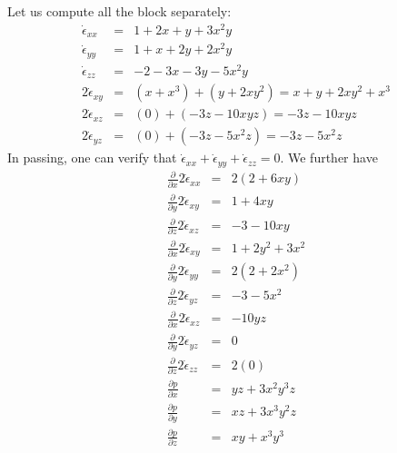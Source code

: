 Let us compute all the block separately:
\begin{eqnarray}
\dot{\epsilon}_{xx}&=& 1+2x+y+3x^2y  \nonumber\\
\dot{\epsilon}_{yy}&=& 1+x+2y+2x^2y \nonumber\\
\dot{\epsilon}_{zz}&=& -2-3x-3y-5x^2y \nonumber\\
2 \dot{\epsilon}_{xy}&=& (x+x^3)+(y+2xy^2) = x+y+2xy^2+x^3 \nonumber\\
2 \dot{\epsilon}_{xz}&=& (0)+(-3z-10xyz) = -3z -10xyz  \nonumber\\
2 \dot{\epsilon}_{yz}&=& (0) + (-3z-5x^2z) = -3z-5x^2z   \nonumber
\end{eqnarray}
In passing, one can verify that 
$
\dot{\epsilon}_{xx}
+\dot{\epsilon}_{yy}
+\dot{\epsilon}_{zz}=0
$.
We further have
\begin{eqnarray}
\frac{\partial}{\partial x} 2\dot{\epsilon}_{xx}&=& 2(2 +6xy) \nonumber\\ 
\frac{\partial}{\partial y} 2\dot{\epsilon}_{xy}&=&  1+4xy \nonumber\\
\frac{\partial}{\partial z} 2\dot{\epsilon}_{xz}&=& -3 -10xy   \nonumber\\ 
\frac{\partial}{\partial x} 2\dot{\epsilon}_{xy}&=& 1+2y^2+3x^2 \nonumber\\ 
\frac{\partial}{\partial y} 2\dot{\epsilon}_{yy}&=& 2( 2+2x^2 ) \nonumber\\ 
\frac{\partial}{\partial z} 2\dot{\epsilon}_{yz}&=& -3-5x^2   \nonumber\\
\frac{\partial}{\partial x} 2\dot{\epsilon}_{xz}&=& -10yz \nonumber\\ 
\frac{\partial}{\partial y} 2\dot{\epsilon}_{yz}&=& 0  \nonumber\\ 
\frac{\partial}{\partial z} 2\dot{\epsilon}_{zz}&=& 2( 0 ) \nonumber\\
\frac{\partial p}{\partial x} &=& yz+3x^2y^3z\\
\frac{\partial p}{\partial y} &=& xz +3x^3y^2z \\
\frac{\partial p}{\partial z} &=& xy+x^3y^3
\end{eqnarray}

